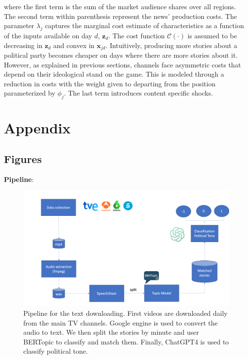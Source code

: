 \documentclass[12pt]{article}
\begin{document}
	where the first term is the sum of the market audience shares over all regions. The second term within parenthesis represent the news' production costs.  The parameter $\lambda_j$ captures the marginal cost estimate of characteristics as a function of the inputs available  on day $d$,  $\bm{z}_d$. The cost function $\mathcal{C}(\cdot)$ is assumed to be decreasing in   $\bm{z}_d$   and convex in $\bm{x}_{jd}$. Intuitively, producing more stories about a political party becomes cheaper on days where there are more stories about it. However, as explained in previous sections, channels face asymmetric costs that depend on their ideological stand on the game. This is modeled through a reduction in costs with the weight given to departing from the position parameterized by $\phi_j$. The last term introduces content specific shocks. 
	
	

	
	
	
	
	
	\clearpage
	
	\section{Appendix}
	
	
	
	
	
	
	
	
	
	
	\subsection{Figures}
	
	
	
	\textbf{Pipeline}:
	
	\begin{figure}[H]
		\centering
		\includegraphics[width=150mm]{figures/pipeline3}
		\caption{Pipeline for the text downloading. First videos are downloaded daily from the main TV channels. Google engine is used to convert the audio to text. We then split the stories by minute and user BERTopic to classify and match them. Finally, ChatGPT4 is used to classify political tone.}
		\label{fig:pipeline}
	\end{figure}
	
\end{document}
